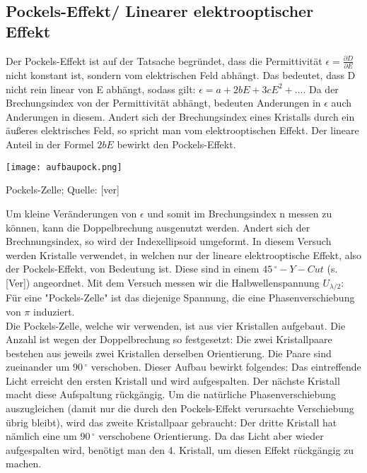 ~\\
~\\
\subsection{Pockels-Effekt/ Linearer elektrooptischer Effekt}
Der Pockels-Effekt ist auf der Tatsache begründet, dass die Permittivität $\epsilon=\frac{\partial D}{\partial E}$ nicht konstant ist, sondern vom elektrischen Feld abhängt. Das bedeutet, dass D nicht rein linear von E abhängt, sodass gilt: $\epsilon=a+2bE+3cE^{2}+...$. Da der Brechungsindex von der Permittivität abhängt, bedeuten Anderungen in $\epsilon$ auch Anderungen in diesem. Andert sich der Brechungsindex eines Kristalls durch ein äußeres elektrisches Feld, so spricht man vom elektrooptischen Effekt. Der lineare Anteil in der Formel $2bE$ bewirkt den Pockels-Effekt.\\
\begin{floatingfigure}[l]{11cm}
\texttt{[image: aufbaupock.png]}
\caption{Pockels-Zelle; Quelle: [ver]}
\end{floatingfigure}
Um kleine Veränderungen von $\epsilon$ und somit im Brechungsindex n messen zu können, kann die Doppelbrechung ausgenutzt werden. Andert sich der Brechnungsindex, so wird der Indexellipsoid umgeformt. In diesem Versuch werden Kristalle verwendet, in welchen nur der lineare elektrooptische Effekt, also der Pockels-Effekt, von Bedeutung ist. Diese sind in einem $45\,^{\circ}-Y-Cut$ (s. [Ver]) angeordnet. Mit dem Versuch messen wir die Halbwellenspannung $U_{\lambda/2}$: Für eine "Pockels-Zelle" ist das diejenige Spannung, die eine Phasenverschiebung von $\pi$ induziert.\\

Die Pockels-Zelle, welche wir verwenden, ist aus vier Kristallen aufgebaut. Die Anzahl ist wegen der Doppelbrechung so festgesetzt: Die zwei Kristallpaare bestehen aus jeweils zwei Kristallen derselben Orientierung. Die Paare sind zueinander um $90\,^{\circ}$ verschoben. Dieser Aufbau bewirkt folgendes: Das eintreffende Licht erreicht den ersten Kristall und wird aufgespalten. Der nächste Kristall macht diese Aufspaltung rückgängig. Um die natürliche Phasenverschiebung auszugleichen (damit nur die durch den Pockels-Effekt verursachte Verschiebung übrig bleibt), wird das zweite Kristallpaar gebraucht: Der dritte Kristall hat nämlich eine um $90\,^{\circ}$ verschobene Orientierung. Da das Licht aber wieder aufgespalten wird, benötigt man den 4. Kristall, um diesen Effekt rückgängig zu machen.